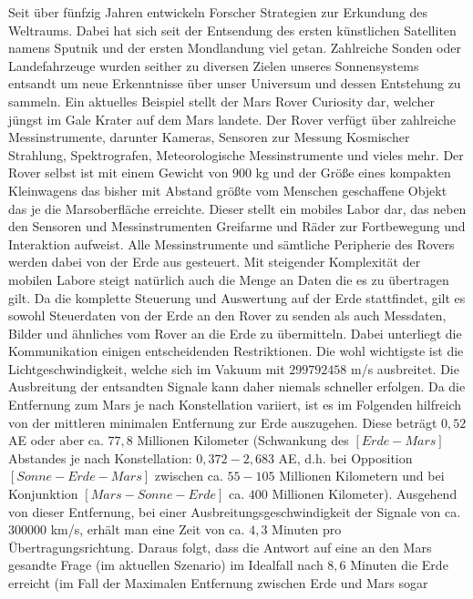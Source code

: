 Seit {\"u}ber f{\"u}nfzig Jahren entwickeln Forscher Strategien zur Erkundung
des Weltraums. Dabei hat sich seit der Entsendung des ersten k{\"u}nstlichen
Satelliten namens Sputnik und der ersten Mondlandung viel getan.
Zahlreiche Sonden oder Landefahrzeuge wurden seither zu diversen Zielen unseres
Sonnensystems entsandt um neue Erkenntnisse {\"u}ber unser Universum und dessen
Entstehung zu sammeln. Ein aktuelles Beispiel stellt der Mars Rover Curiosity
dar, welcher j{\"u}ngst im Gale Krater auf dem Mars landete. Der Rover
verf{\"u}gt {\"u}ber zahlreiche Messinstrumente, darunter Kameras, Sensoren zur
Messung Kosmischer Strahlung, Spektrografen, Meteorologische Messinstrumente und
vieles mehr. Der Rover selbst ist mit einem Gewicht von $900$ kg und der
Gr{\"o}{\ss}e eines kompakten Kleinwagens das bisher mit Abstand gr{\"o}{\ss}te
vom Menschen geschaffene Objekt das je die Marsoberfl{\"a}che erreichte.
Dieser stellt ein mobiles Labor dar, das neben den Sensoren und Messinstrumenten
Greifarme und R{\"a}der zur Fortbewegung und Interaktion aufweist. Alle
Messinstrumente und s{\"a}mtliche Peripherie des Rovers werden dabei von der
Erde aus gesteuert. Mit steigender Komplexit{\"a}t der mobilen Labore
steigt nat{\"u}rlich auch die Menge an Daten die es zu {\"u}bertragen gilt. Da
die komplette Steuerung und Auswertung auf der Erde stattfindet, gilt es sowohl
Steuerdaten von der Erde an den Rover zu senden als auch Messdaten, Bilder und
{\"a}hnliches vom Rover an die Erde zu {\"u}bermitteln. Dabei unterliegt die
Kommunikation einigen entscheidenden Restriktionen. Die wohl wichtigste ist die
Lichtgeschwindigkeit, welche sich im Vakuum mit $299 792 458$ m/s ausbreitet.
Die Ausbreitung der entsandten Signale kann daher niemals schneller erfolgen. Da die
Entfernung zum Mars je nach Konstellation variiert, ist es im Folgenden
hilfreich von der mittleren minimalen Entfernung zur Erde auszugehen. Diese
betr{\"a}gt $0,52$ AE oder aber ca. $77,8$ Millionen Kilometer (Schwankung des
$[Erde - Mars]$ Abstandes je nach Konstellation: $0,372 - 2,683$ AE, d.h. bei
Opposition $[Sonne - Erde - Mars]$ zwischen ca. $55 - 105$ Millionen Kilometern
und bei Konjunktion $[Mars - Sonne - Erde]$ ca. $400$ Millionen Kilometer).
Ausgehend von dieser Entfernung, bei einer Ausbreitungsgeschwindigkeit der
Signale von ca. $300 000$ km/s, erh{\"a}lt man eine Zeit von ca. $4,3$ Minuten
pro {\"U}bertragungsrichtung. Daraus folgt, dass die Antwort auf eine an den
Mars gesandte Frage (im aktuellen Szenario) im Idealfall nach $8,6$ Minuten die
Erde erreicht (im Fall der Maximalen Entfernung zwischen Erde und Mars sogar
